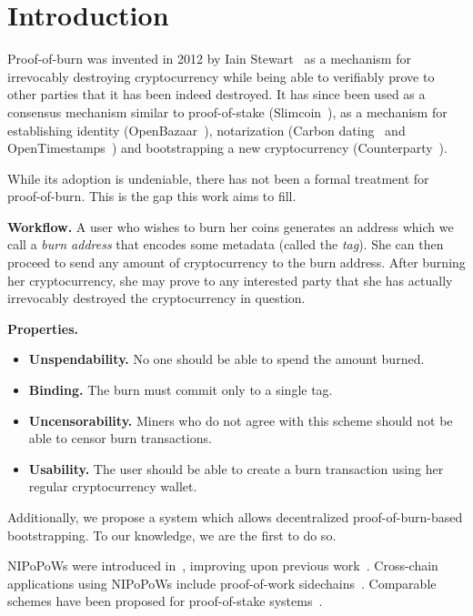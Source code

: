 \section{Introduction}\label{section:introduction}
Proof-of-burn was invented in 2012 by Iain Stewart~\cite{stewart} as a mechanism for irrevocably destroying cryptocurrency while being able to verifiably prove to other parties that it has been indeed destroyed. It has since been used as a consensus mechanism similar to proof-of-stake (Slimcoin~\cite{slimcoin}), as a mechanism for establishing identity (OpenBazaar~\cite{zindros2016trust}), notarization (Carbon dating~\cite{clark2012commitcoin} and OpenTimestamps~\cite{todd2016opentimestamps}) and bootstrapping a new cryptocurrency (Counterparty~\cite{counterparty}).

While its adoption is undeniable, there has not been a formal treatment for proof-of-burn. This is the gap this work aims to fill.

\noindent
\textbf{Workflow.}
A user who wishes to burn her coins generates an address which we call a \emph{burn address} that encodes some metadata (called the \emph{tag}). She can then proceed to send any amount of cryptocurrency to the burn address. After burning her cryptocurrency, she may prove to any interested party that she has actually irrevocably destroyed the cryptocurrency in question.

\noindent
\textbf{Properties.}
\begin{itemize}
    \item \textbf{Unspendability.} No one should be able to spend the amount burned.
    \item \textbf{Binding.} The burn must commit only to a single tag.
    \item \textbf{Uncensorability.} Miners who do not agree with this scheme should not be able to censor burn transactions.
    \item \textbf{Usability.} The user should be able to create a burn transaction using her regular cryptocurrency wallet.
\end{itemize}

Additionally, we propose a system which allows decentralized proof-of-burn-based bootstrapping. To our knowledge, we are the first to do so.

NIPoPoWs were introduced in~\cite{nipopows}, improving upon previous
work~\cite{popow,highway}. Cross-chain applications using NIPoPoWs include
proof-of-work sidechains~\cite{pow-sidechains}. Comparable schemes have been
proposed for proof-of-stake systems~\cite{pos-sidechains}.

